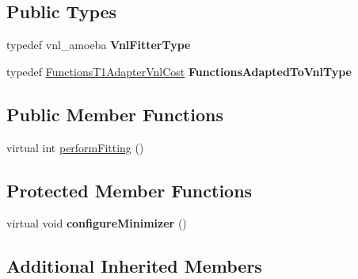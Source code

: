 \subsection*{Public Types}
\begin{DoxyCompactItemize}
\item 
\hypertarget{class_ox_1_1_fitter_amoeba_vnl_a1e111bef9b9c7b8cda195729f0eafe7c}{typedef vnl\-\_\-amoeba {\bfseries Vnl\-Fitter\-Type}}\label{class_ox_1_1_fitter_amoeba_vnl_a1e111bef9b9c7b8cda195729f0eafe7c}

\item 
\hypertarget{class_ox_1_1_fitter_amoeba_vnl_a7525477163c41620aa3666dcd68bcc2f}{typedef \hyperlink{class_ox_1_1_functions_t1_adapter_vnl_cost}{Functions\-T1\-Adapter\-Vnl\-Cost} {\bfseries Functions\-Adapted\-To\-Vnl\-Type}}\label{class_ox_1_1_fitter_amoeba_vnl_a7525477163c41620aa3666dcd68bcc2f}

\end{DoxyCompactItemize}
\subsection*{Public Member Functions}
\begin{DoxyCompactItemize}
\item 
virtual int \hyperlink{class_ox_1_1_fitter_amoeba_vnl_a0c198974c2a95d0eb35cfe4c838e516c}{perform\-Fitting} ()
\end{DoxyCompactItemize}
\subsection*{Protected Member Functions}
\begin{DoxyCompactItemize}
\item 
\hypertarget{class_ox_1_1_fitter_amoeba_vnl_aedd8b41fee6a197c0d92b8690f34d9f8}{virtual void {\bfseries configure\-Minimizer} ()}\label{class_ox_1_1_fitter_amoeba_vnl_aedd8b41fee6a197c0d92b8690f34d9f8}

\end{DoxyCompactItemize}
\subsection*{Additional Inherited Members}


